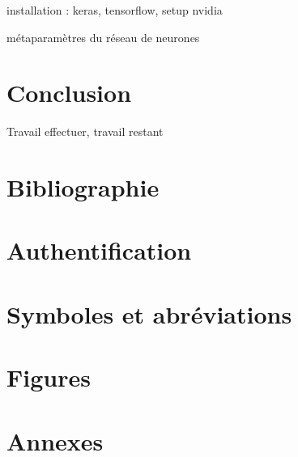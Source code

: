\documentclass[a4paper]{report}
\begin{document}
installation : keras, tensorflow, setup nvidia

métaparamètres du réseau de neurones

\chapter{Conclusion}
Travail effectuer, travail restant

\chapter{Bibliographie}


\chapter{Authentification}


\chapter{Symboles et abréviations}


\chapter{Figures}


\chapter{Annexes}
\end{document}
